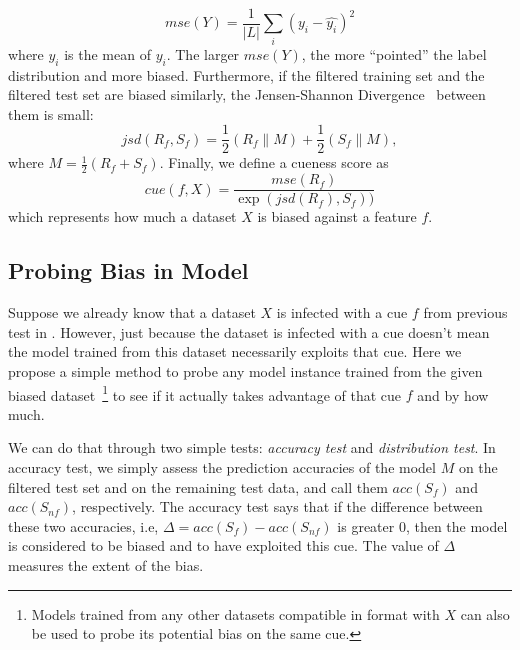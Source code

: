 \begin{equation}
mse(Y) = \frac{1}{|L|} \sum_i (y_i - \hat{y_i})^2
\end{equation}
where $\hat{y_i}$ is the mean of $y_i$. The larger $mse(Y)$, 
the more ``pointed'' the label distribution and more biased. 
Furthermore, if the filtered training set and 
the filtered test set are biased similarly,
the Jensen-Shannon Divergence~\cite{lin1991divergence} between
them is small:
\begin{equation}
jsd(R_f, S_f) = \frac{1}{2}\left (R_f\parallel M  \right )+\frac{1}{2}\left (S_f\parallel M  \right ), 
\end{equation}
where $M= \frac{1}{2}\left (R_f+S_f \right )$. 
Finally, we define a cueness score as
\begin{equation}
cue(f, X) = \frac{mse(R_f)}{\exp(jsd(R_f), S_f))}
\end{equation} 
which represents how much a dataset $X$ is biased against a feature
$f$. 

\subsection{Probing Bias in Model}
\label{sec:evalmodel}

Suppose we already know that a dataset $X$ is infected with a cue $f$ from previous
test in .
However, just because the dataset is infected with a cue doesn't mean
the model trained from this dataset necessarily exploits that cue.
Here we propose a simple method to probe any model instance trained from the
given biased dataset~\footnote{Models trained from any other 
datasets compatible in format with $X$ can also be used to probe its potential
bias on the same cue.} to see if it actually takes advantage of that cue $f$
and by how much.

We can do that through two simple tests: 
{\em accuracy test} and {\em distribution test}.
In accuracy test, we simply assess the prediction accuracies of the model
$M$ on the filtered test set and on the remaining test data, and call them
$acc(S_f)$ and $acc(S_{nf})$, respectively. The accuracy test says that if the difference
between these two accuracies, i.e, $\Delta=acc(S_f) - acc(S_{nf})$ is greater 0, then the
model is considered to be biased and to have exploited this cue. 
The value of $\Delta$ measures the extent of the bias.
 
